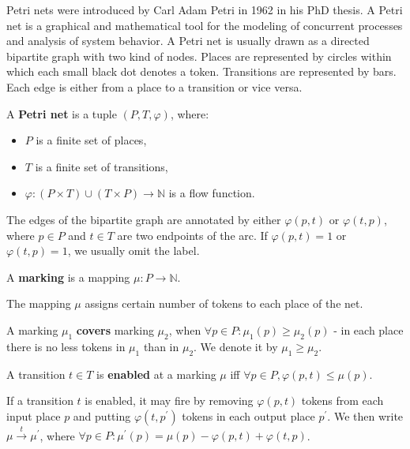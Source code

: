 Petri nets \cite{Petri62,Yen06PetriNets} were introduced by Carl Adam Petri in 1962 in his PhD thesis. A Petri net is a graphical and mathematical tool for the modeling of concurrent processes and analysis of system behavior. A Petri net is usually drawn as a directed bipartite graph with two kind of nodes. Places are represented by circles within which each small black dot denotes a token. Transitions are represented by bars. Each edge is either from a place to a transition or vice versa.

\begin{definition}
  A {\bf Petri net} is a tuple $(P, T, \varphi)$, where:
  \begin{itemize}
    \item $P$ is a finite set of places,
    \item $T$ is a finite set of transitions,
    \item $\varphi: (P\times T)\cup(T\times P)\rightarrow \mathbb N$ is a flow function.
  \end{itemize}
\end{definition}

The edges of the bipartite graph are annotated by either $\varphi(p,t)$ or $\varphi(t,p)$, where $p\in P$ and $t\in T$ are two endpoints of the arc. If $\varphi(p,t)=1$ or $\varphi(t,p)=1$, we usually omit the label.

\begin{definition}
  A {\bf marking} is a mapping $\mu: P\rightarrow \mathbb N$.
\end{definition}

The mapping $\mu$ assigns certain number of tokens to each place of the net.

\begin{definition}
  A marking $\mu_1$ {\bf covers} marking $\mu_2$, when $\forall p\in P: \mu_1(p)\geq\mu_2(p)$ - in each place there is no less tokens in $\mu_1$ than in $\mu_2$. We denote it by $\mu_1\geq\mu_2$.
\end{definition} 

\begin{definition}
  A transition $t\in T$ is {\bf enabled} at a marking $\mu$ iff $\forall p\in P, \varphi(p,t)\leq\mu(p)$.
\end{definition}

If a transition $t$ is enabled, it may fire by removing $\varphi(p,t)$ tokens from each input place $p$ and putting $\varphi(t,p^\prime)$ tokens in each output place $p^\prime$. We then write $\mu\xrightarrow{t} \mu^\prime$, where $\forall p\in P: \mu^\prime(p) = \mu(p)-\varphi(p,t)+\varphi(t,p)$.

